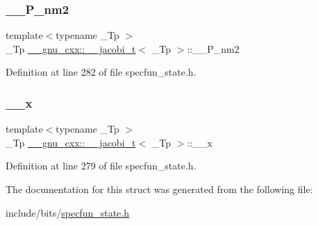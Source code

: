 \subsubsection{\texorpdfstring{\+\_\+\+\_\+\+P\+\_\+nm2}{\_\_P\_nm2}}
{\footnotesize\ttfamily template$<$typename \+\_\+\+Tp $>$ \\
\+\_\+\+Tp \hyperlink{struct____gnu__cxx_1_1____jacobi__t}{\+\_\+\+\_\+gnu\+\_\+cxx\+::\+\_\+\+\_\+jacobi\+\_\+t}$<$ \+\_\+\+Tp $>$\+::\+\_\+\+\_\+\+P\+\_\+nm2}



Definition at line 282 of file specfun\+\_\+state.\+h.

\mbox{\label{struct____gnu__cxx_1_1____jacobi__t_aa3213c7241c094633f0be6f210b04e17}} 
\subsubsection{\texorpdfstring{\+\_\+\+\_\+x}{\_\_x}}
{\footnotesize\ttfamily template$<$typename \+\_\+\+Tp $>$ \\
\+\_\+\+Tp \hyperlink{struct____gnu__cxx_1_1____jacobi__t}{\+\_\+\+\_\+gnu\+\_\+cxx\+::\+\_\+\+\_\+jacobi\+\_\+t}$<$ \+\_\+\+Tp $>$\+::\+\_\+\+\_\+x}



Definition at line 279 of file specfun\+\_\+state.\+h.



The documentation for this struct was generated from the following file\+:\begin{DoxyCompactItemize}
\item 
include/bits/\hyperlink{specfun__state_8h}{specfun\+\_\+state.\+h}\end{DoxyCompactItemize}
